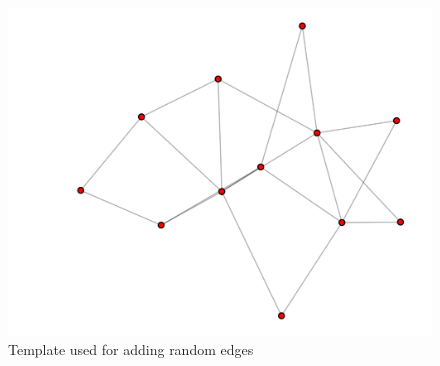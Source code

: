 \begin{enumerate}
\begin{figure}[H]
\begin{minipage}{.5\textwidth}
			\includegraphics[scale=0.22]{Images/datasetgen2.pdf}
			\caption{Template used for adding random edges \label{fig:template}}
		\end{minipage}


\end{figure}
\end{enumerate}
